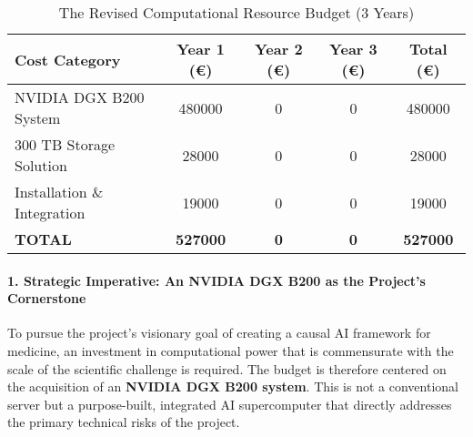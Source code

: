 \begin{table}[H]
\centering
\caption{The Revised Computational Resource Budget (3 Years)}
\label{tab:computational_budget}
\begin{tabular}{lS[table-format=6.0]S[table-format=6.0]S[table-format=6.0]S[table-format=6.0]}
\toprule
\textbf{Cost Category} & {\textbf{Year 1 (€)}} & {\textbf{Year 2 (€)}} & {\textbf{Year 3 (€)}} & {\textbf{Total (€)}} \\
\midrule
NVIDIA DGX B200 System & 480000 & 0 & 0 & 480000 \\
300 TB Storage Solution & 28000 & 0 & 0 & 28000 \\
Installation \& Integration & 19000 & 0 & 0 & 19000 \\
\midrule
\textbf{TOTAL} & \textbf{527000} & \textbf{0} & \textbf{0} & \textbf{527000} \\
\bottomrule
\end{tabular}
\end{table}

\paragraph{1. Strategic Imperative: An NVIDIA DGX B200 as the Project's Cornerstone}
To pursue the project's visionary goal of creating a causal AI framework for medicine, an investment in computational power that is commensurate with the scale of the scientific challenge is required. The budget is therefore centered on the acquisition of an \textbf{NVIDIA DGX B200 system}. This is not a conventional server but a purpose-built, integrated AI supercomputer that directly addresses the primary technical risks of the project.

